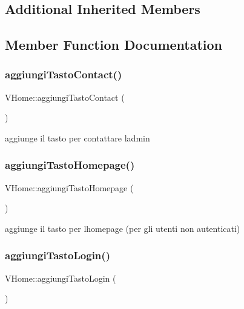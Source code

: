 \subsection*{Additional Inherited Members}


\subsection{Member Function Documentation}
\mbox{\label{class_v_home_ac9fd5bec876ca9999718b2d2ba140d21}} 
\subsubsection{\texorpdfstring{aggiungi\+Tasto\+Contact()}{aggiungiTastoContact()}}
{\footnotesize\ttfamily V\+Home\+::aggiungi\+Tasto\+Contact (\begin{DoxyParamCaption}{ }\end{DoxyParamCaption})}

aggiunge il tasto per contattare l\textquotesingle{}admin \mbox{\label{class_v_home_a3a1dff61eae360811ce56990ab8de7ea}} 
\subsubsection{\texorpdfstring{aggiungi\+Tasto\+Homepage()}{aggiungiTastoHomepage()}}
{\footnotesize\ttfamily V\+Home\+::aggiungi\+Tasto\+Homepage (\begin{DoxyParamCaption}{ }\end{DoxyParamCaption})}

aggiunge il tasto per l\textquotesingle{}homepage (per gli utenti non autenticati) \mbox{\label{class_v_home_a3e06682fe6e21b37b754eeae97125508}} 
\subsubsection{\texorpdfstring{aggiungi\+Tasto\+Login()}{aggiungiTastoLogin()}}
{\footnotesize\ttfamily V\+Home\+::aggiungi\+Tasto\+Login (\begin{DoxyParamCaption}{ }\end{DoxyParamCaption})}

